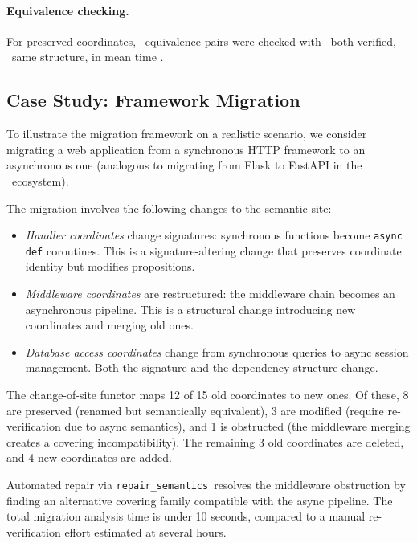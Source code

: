 \documentclass[11pt]{article}
\newcommand{\RepairSem}{\texttt{repair\_semantics}}
\begin{document}
\paragraph{Equivalence checking.}
For preserved coordinates, \compEquivPairs\ equivalence pairs were checked
with \compEquivBothVerified\ both verified, \compEquivSameStructure\ same
structure, in mean time \compEquivMeanTime.

\subsection{Case Study: Framework Migration}\label{sec:case-study}

To illustrate the migration framework on a realistic scenario, we consider
migrating a web application from a synchronous HTTP framework to an
asynchronous one (analogous to migrating from Flask to FastAPI in the
\Python\ ecosystem).

The migration involves the following changes to the semantic site:
\begin{itemize}[noitemsep]
  \item \emph{Handler coordinates} change signatures: synchronous functions
        become \texttt{async def} coroutines.  This is a signature-altering
        change that preserves coordinate identity but modifies propositions.
  \item \emph{Middleware coordinates} are restructured: the middleware
        chain becomes an asynchronous pipeline.  This is a structural change
        introducing new coordinates and merging old ones.
  \item \emph{Database access coordinates} change from synchronous queries
        to async session management.  Both the signature and the dependency
        structure change.
\end{itemize}

The change-of-site functor maps 12 of 15 old coordinates to new ones.
Of these, 8 are preserved (renamed but semantically equivalent), 3 are
modified (require re-verification due to async semantics), and 1 is
obstructed (the middleware merging creates a covering incompatibility).
The remaining 3 old coordinates are deleted, and 4 new coordinates are
added.

Automated repair via \RepairSem\ resolves the middleware obstruction by
finding an alternative covering family compatible with the async pipeline.
The total migration analysis time is under 10 seconds, compared to a manual
re-verification effort estimated at several hours.
\end{document}
